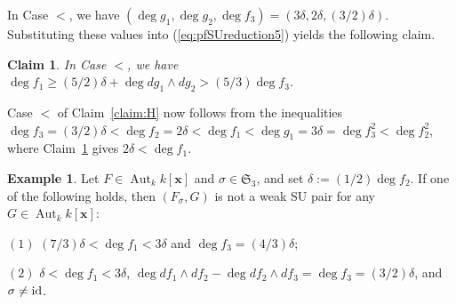\documentclass{amsart}
\theoremstyle{plain}
\newtheorem{claim}{Claim}
\theoremstyle{definition}
\newtheorem{example}[thm]{Example}
\newcommand{\Aut }{\mathop{\mathrm{Aut}}\nolimits}
\newcommand{\id}{{\rm id}}
\newcommand{\nd}{\noindent}
\newcommand{\x}{{\boldsymbol x}}
\newcommand{\kx}{k[\x]}
\newcommand{\sym}{\mathfrak{S}}
\begin{document}
In Case $<$, 
we have $(\deg g_1,\deg g_2,\deg f_3)=(3\delta ,2\delta ,(3/2)\delta )$. 
Substituting these values into 
(\ref{eq:pfSUreduction5}) yields the following claim. 



\begin{claim}\label{claim:P5}
In Case $<$, we have 
$\deg f_1\ge (5/2)\delta +\deg dg_1\wedge dg_2
>(5/3)\deg f_3$. 
\end{claim}


Case $<$ of Claim~\ref{claim:H} 
now follows from the inequalities 
$\deg f_3=(3/2)\delta 
<\deg f_2=2\delta <\deg f_1<\deg g_1=3\delta =\deg f_3^2<\deg f_2^2$, 
where Claim~\ref{claim:P5} gives $2\delta <\deg f_1$. 


\begin{example}\label{ex:WSU sigma=id}
Let $F\in \Aut _k\kx $ 
and $\sigma \in \sym _3$, 
and set $\delta :=(1/2)\deg f_2$. 
If one of the following holds, 
then $(F_{\sigma },G)$ is not a weak SU pair 
for any $G\in \Aut _k\kx $: 


\nd $(1)$ 
$(7/3)\delta <\deg f_1<3\delta $ 
and $\deg f_3=(4/3)\delta $; 


\nd $(2)$ 
$\delta <\deg f_1<3\delta $, 
$\deg df_1\wedge df_2-\deg df_2\wedge df_3=\deg f_3=(3/2)\delta $, 
and $\sigma \ne \id $. 

\end{example}
\end{document}
